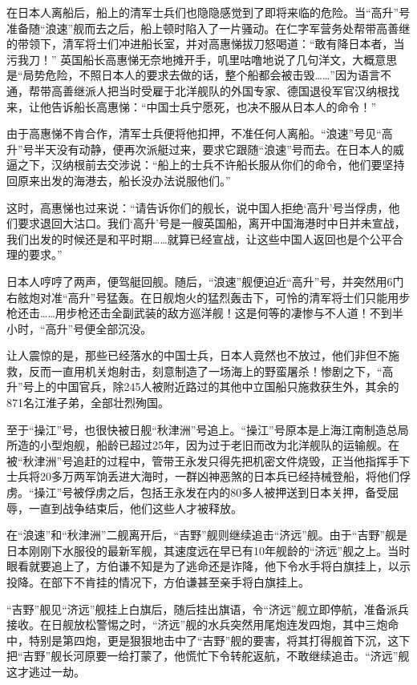 \documentclass[12pt,UTF8]{ctexbook}
\begin{document}
在日本人离船后，船上的清军士兵们也隐隐感觉到了即将来临的危险。当“高升”号准备随“浪速”舰而去之后，船上顿时陷入了一片骚动。在仁字军营务处帮带高善继的带领下，清军将士们冲进船长室，并对高惠悌拔刀怒喝道：“敢有降日本者，当污我刀！”
英国船长高惠悌无奈地摊开手，叽里咕噜地说了几句洋文，大概意思是“局势危险，不照日本人的要求去做的话，整个船都会被击毁……”因为语言不通，帮带高善继派人把当时受雇于北洋舰队的外国专家、德国退役军官汉纳根找来，让他告诉船长高惠悌：“中国士兵宁愿死，也决不服从日本人的命令！”

由于高惠悌不肯合作，清军士兵便将他扣押，不准任何人离船。“浪速”号见“高升”号半天没有动静，便再次派艇过来，要求它跟随“浪速”号而去。在日本人的威逼之下，汉纳根前去交涉说：“船上的士兵不许船长服从你们的命令，他们要坚持回原来出发的海港去，船长没办法说服他们。”

这时，高惠悌也过来说：“请告诉你们的舰长，说中国人拒绝‘高升’号当俘虏，他们要求退回大沽口。我们‘高升’号是一艘英国船，离开中国海港时中日并未宣战，我们出发的时候还是和平时期……就算已经宣战，让这些中国人返回也是个公平合理的要求。”

日本人哼哼了两声，便驾艇回舰。随后，“浪速”舰便迫近“高升”号，并突然用6门右舷炮对准“高升”号猛轰。在日舰炮火的猛烈轰击下，可怜的清军将士们只能用步枪还击……用步枪还击全副武装的敌方巡洋舰！这是何等的凄惨与不人道！不到半小时，“高升”号便全部沉没。

让人震惊的是，那些已经落水的中国士兵，日本人竟然也不放过，他们非但不施救，反而一直用机关炮射击，刻意制造了一场海上的野蛮屠杀！惨剧之下，“高升”号上的中国官兵，除245人被附近路过的其他中立国船只施救获生外，其余的871名江淮子弟，全部壮烈殉国。

至于“操江”号，也很快被日舰“秋津洲”号追上。“操江”号原本是上海江南制造总局所造的小型炮舰，船龄已超过25年，因为过于老旧而改为北洋舰队的运输舰。在被“秋津洲”号追赶的过程中，管带王永发只得先把机密文件烧毁，正当他指挥手下士兵将20多万两军饷丢进大海时，一群凶神恶煞的日本兵已经持械登船，将他们俘虏。“操江”号被俘虏之后，包括王永发在内的80多人被押送到日本关押，备受屈辱，一直到战争结束后，他们这些人才被释放。

在“浪速”和“秋津洲”二舰离开后，“吉野”舰则继续追击“济远”舰。由于“吉野”舰是日本刚刚下水服役的最新军舰，其速度远在早已有10年舰龄的“济远”舰之上。当时眼看就要追上了，方伯谦不知是为了逃命还是诈降，他下令水手将白旗挂上，以示投降。在部下不肯挂的情况下，方伯谦甚至亲手将白旗挂上。

“吉野”舰见“济远”舰挂上白旗后，随后挂出旗语，令“济远”舰立即停航，准备派兵接收。在日舰放松警惕之时，“济远”舰的水兵突然用尾炮连发四炮，其中三炮命中，特别是第四炮，更是狠狠地击中了“吉野”舰的要害，将其打得舰首下沉，这下把“吉野”舰长河原要一给打蒙了，他慌忙下令转舵返航，不敢继续追击。“济远”舰这才逃过一劫。
\end{document}

